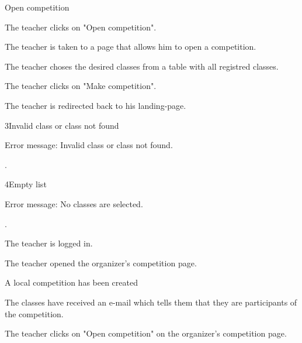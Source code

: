 \begin{uc}{Open competition}

    \begin{uc-mss}
    \item The teacher clicks on "Open competition".
    \item The teacher is taken to a page that allows him to open a competition.
    \item The teacher choses the desired classes from a table with all registred classes.
    \item The teacher clicks on "Make competition".
    \item The teacher is redirected back to his landing-page.
    \end{uc-mss}

    \begin{uc-ext}
        \begin{uc-fail}{3}{Invalid class or class not found}
        \item Error message: Invalid class or class not found.
        \item {}.
        \end{uc-fail}
	
	\begin{uc-fail}{4}{Empty list}
	\item Error message: No classes are selected.
	\item {}.
	\end{uc-fail}
    \end{uc-ext}

    \begin{uc-pre}
    	\item The teacher is logged in.
    	\item The teacher opened the organizer's competition page.
    \end{uc-pre}

    \begin{uc-post}
    \item A local competition has been created
    \item The classes have received an e-mail which tells them that they are participants of the competition.
    \end{uc-post}

    \begin{uc-trig}
        The teacher clicks on "Open competition" on the organizer's competition page.
    \end{uc-trig}

\end{uc}
